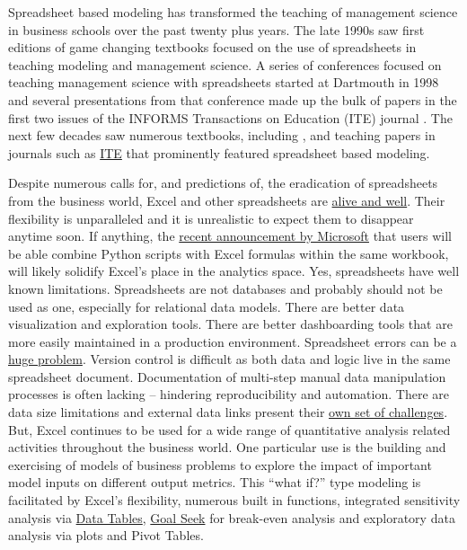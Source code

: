 \documentclass[ited]{informs3}                      %
\begin{document}
Spreadsheet based modeling has transformed the teaching of management science in business schools over the past twenty plus years. The late 1990s saw first editions of game changing textbooks \citep{winstonPracticalManagementScience2018,ragsdaleSpreadsheetModelingDecision2017} focused on the use of spreadsheets in teaching modeling and management science.  A series of conferences focused on teaching management science with spreadsheets started at Dartmouth in 1998 and several presentations from that conference made up the bulk of papers in the first two issues of the INFORMS Transactions on Education (ITE) journal \citep{baker2000:lp,bell2000:statistics,evans2000:simulation,carraway2000:mba,ragsdale2001:teaching,savage2001:blitzograms}. The next few decades saw numerous textbooks, including {\citet{powellBusinessAnalyticsArt2019, camm2020business}}, and teaching papers in journals such as \href{https://pubsonline.informs.org/journal/ited}{ITE} that prominently featured spreadsheet based modeling.

Despite numerous calls for, and predictions of, the eradication of spreadsheets from the business world, Excel and other spreadsheets are \href{https://benn.substack.com/p/the-next-billion-programmers}{alive and well}. Their flexibility is unparalleled and it is unrealistic to expect them to disappear anytime soon. If anything, the \href{https://techcommunity.microsoft.com/t5/excel-blog/announcing-python-in-excel-combining-the-power-of-python-and-the/ba-p/3893439}{recent announcement by Microsoft} that users will be able combine Python scripts with Excel formulas within the same workbook, will likely solidify Excel's place in the analytics space. Yes, spreadsheets have well known limitations. Spreadsheets are not databases and probably should not be used as one, especially for relational data models. There are better data visualization and exploration tools. There are better dashboarding tools that are more easily maintained in a production environment. Spreadsheet errors can be a \href{https://eusprig.org/research-info/horror-stories/}{huge problem}. Version control is difficult as both data and logic live in the same spreadsheet document. Documentation of multi-step manual data manipulation processes is often lacking -- hindering reproducibility and automation. There are data size limitations and external data links present their \href{https://www.thespreadsheetguru.com/find-remove-external-links/}{own set of challenges}. But, Excel continues to be used for a wide range of quantitative analysis related activities throughout the business world. One particular use is the building and exercising of models of business problems
to explore the impact of important model inputs on different output metrics. This ``what if?'' type modeling is facilitated by Excel's flexibility, numerous built in functions, integrated sensitivity analysis via \href{https://support.microsoft.com/en-us/office/calculate-multiple-results-by-using-a-data-table-e95e2487-6ca6-4413-ad12-77542a5ea50b}{Data Tables},  \href{https://support.microsoft.com/en-us/office/use-goal-seek-to-find-the-result-you-want-by-adjusting-an-input-value-320cb99e-f4a4-417f-b1c3-4f369d6e66c7}{Goal
	Seek} for break-even analysis and exploratory data analysis via plots and Pivot Tables. 
\end{document}
